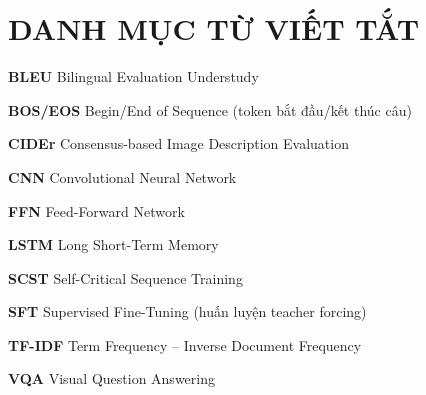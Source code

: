 \chapter*{DANH MỤC TỪ VIẾT TẮT}

\begin{abbrv}
	\item \textbf{BLEU} \quad Bilingual Evaluation Understudy
	\item \textbf{BOS/EOS} \quad Begin/End of Sequence (token bắt đầu/kết thúc câu)
	\item \textbf{CIDEr} \quad Consensus-based Image Description Evaluation
	\item \textbf{CNN} \quad Convolutional Neural Network
	\item \textbf{FFN} \quad Feed-Forward Network
	\item \textbf{LSTM} \quad Long Short-Term Memory
	\item \textbf{SCST} \quad Self-Critical Sequence Training
	\item \textbf{SFT} \quad Supervised Fine-Tuning (huấn luyện teacher forcing)
	\item \textbf{TF-IDF} \quad Term Frequency -- Inverse Document Frequency
	\item \textbf{VQA} \quad Visual Question Answering
\end{abbrv}
\clearpage
